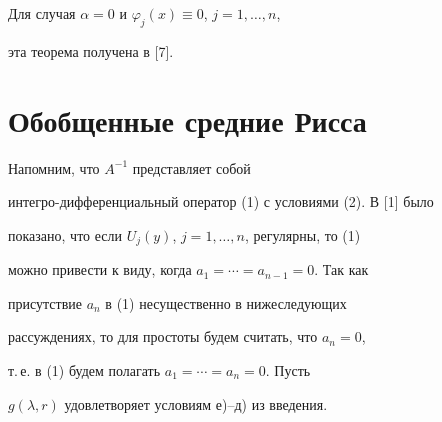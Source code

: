 Для случая $\alpha=0$ и $\varphi_j(x)\equiv 0$, $j=1,\dotsc,n$,


эта теорема получена в [7].








\section{Обобщенные средние Рисса}





Напомним, что $A^{-1}$ представляет собой


интегро-дифференциальный оператор (1) с условиями (2). В [1] было


показано, что если $U_j(y)$, $j=1,\dotsc,n$, регулярны, то (1)


можно привести к виду, когда $a_1=\dotsb=a_{n-1}=0$. Так как


присутствие $a_n$ в (1) несущественно в нижеследующих


рассуждениях, то для простоты будем считать, что $a_n=0$,


т.\,е. в (1) будем полагать $a_1=\dotsb=a_n=0$. Пусть


$g(\lambda,r)$ удовлетворяет условиям е)--д) из введения.





